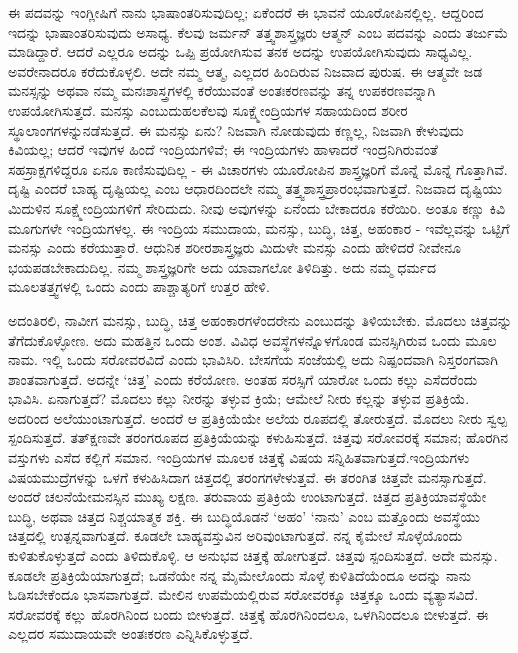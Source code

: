 ಈ ಪದವನ್ನು ಇಂಗ್ಲೀಷಿಗೆ ನಾನು ಭಾಷಾಂತರಿಸುವುದಿಲ್ಲ; ಏಕೆಂದರೆ ಈ ಭಾವನೆ ಯೂರೋಪಿನಲ್ಲಿಲ್ಲ. ಆದ್ದರಿಂದ ಇದನ್ನು ಭಾಷಾಂತರಿಸುವುದು ಅಸಾಧ್ಯ. ಕೆಲವು ಜರ್ಮನ್​ ತತ್ತ್ವಶಾಸ್ತ್ರಜ್ಞರು ಆತ್ಮನ್​ ಎಂಬ ಪದವನ್ನು  ಎಂದು ತರ್ಜುಮೆ ಮಾಡಿದ್ದಾರೆ. ಆದರೆ ಎಲ್ಲರೂ ಅದನ್ನು ಒಪ್ಪಿ ಪ್ರಯೋಗಿಸುವ ತನಕ ಅದನ್ನು ಉಪಯೋಗಿಸುವುದು ಸಾಧ್ಯವಿಲ್ಲ. ಅವರೇನಾದರೂ ಕರೆದು\-ಕೊಳ್ಳಲಿ. ಅದೇ ನಮ್ಮ ಆತ್ಮ, ಎಲ್ಲದರ ಹಿಂದಿರುವ ನಿಜವಾದ ಪುರುಷ. ಈ ಆತ್ಮವೇ ಜಡ ಮನಸ್ಸನ್ನು ಅಥವಾ ನಮ್ಮ ಮನಃಶಾಸ್ತ್ರಗಳಲ್ಲಿ ಕರೆಯುವಂತೆ ಅಂತಃಕರಣವನ್ನು ತನ್ನ ಉಪಕರಣವನ್ನಾಗಿ ಉಪಯೋಗಿಸುತ್ತದೆ. ಮನಸ್ಸು ಎಂಬುದು\break ಹಲಕೆಲವು ಸೂಕ್ಷ್ಮೇಂದ್ರಿಯಗಳ ಸಹಾಯದಿಂದ ಶರೀರ ಸ್ಥೂಲಾಂಗಗಳನ್ನು\break ನಡೆಸುತ್ತದೆ. ಈ ಮನಸ್ಸು ಏನು? ನಿಜವಾಗಿ ನೋಡುವುದು ಕಣ್ಣಲ್ಲ, ನಿಜವಾಗಿ ಕೇಳುವುದು ಕಿವಿಯಲ್ಲ; ಆದರೆ ಇವುಗಳ ಹಿಂದೆ ಇಂದ್ರಿಯಗಳಿವೆ; ಈ ಇಂದ್ರಿಯಗಳು ಹಾಳಾದರೆ ಇಂದ್ರನಿಗಿರುವಂತೆ ಸಹಸ್ರಾಕ್ಷಗಳಿದ್ದರೂ ಏನೂ ಕಾಣಿಸುವು\-ದಿಲ್ಲ - ಈ ವಿಚಾರಗಳು ಯೂರೋಪಿನ ಶಾಸ್ತ್ರಜ್ಞರಿಗೆ ಮೊನ್ನೆ ಮೊನ್ನೆ ಗೊತ್ತಾಗಿವೆ. ದೃಷ್ಟಿ ಎಂದರೆ ಬಾಹ್ಯ ದೃಷ್ಟಿಯಲ್ಲ ಎಂಬ ಆಧಾರದಿಂದಲೇ ನಮ್ಮ ತತ್ತ್ವಶಾಸ್ತ್ರಪ್ರಾರಂಭವಾಗುತ್ತದೆ. ನಿಜವಾದ ದೃಷ್ಟಿಯು ಮಿದುಳಿನ ಸೂಕ್ಷ್ಮೇಂದ್ರಿಯಗಳಿಗೆ ಸೇರಿದುದು. ನೀವು ಅವುಗಳನ್ನು ಏನೆಂದು ಬೇಕಾದರೂ ಕರೆಯಿರಿ. ಅಂತೂ ಕಣ್ಣು ಕಿವಿ ಮೂಗುಗಳೇ ಇಂದ್ರಿಯಗಳಲ್ಲ. ಈ ಇಂದ್ರಿಯ ಸಮುದಾಯ, ಮನಸ್ಸು, ಬುದ್ಧಿ, ಚಿತ್ತ, ಅಹಂಕಾರ - ಇವೆಲ್ಲವನ್ನು ಒಟ್ಟಿಗೆ ಮನಸ್ಸು  ಎಂದು ಕರೆಯುತ್ತಾರೆ. ಆಧುನಿಕ ಶರೀರಶಾಸ್ತ್ರಜ್ಞರು ಮಿದುಳೇ ಮನಸ್ಸು ಎಂದು ಹೇಳಿದರೆ ನೀವೇನೂ ಭಯಪಡಬೇಕಾದುದಿಲ್ಲ. ನಮ್ಮ ಶಾಸ್ತ್ರಜ್ಞರಿಗೇ ಅದು ಯಾವಾಗಲೋ ತಿಳಿದಿತ್ತು. ಅದು ನಮ್ಮ ಧರ್ಮದ ಮೂಲತತ್ತ್ವಗಳಲ್ಲಿ ಒಂದು ಎಂದು ಪಾಶ್ಚಾತ್ಯರಿಗೆ ಉತ್ತರ ಹೇಳಿ.

ಅದಂತಿರಲಿ, ನಾವೀಗ ಮನಸ್ಸು, ಬುದ್ಧಿ, ಚಿತ್ತ ಅಹಂಕಾರಗಳೆಂದರೇನು ಎಂಬುದನ್ನು ತಿಳಿಯಬೇಕು. ಮೊದಲು ಚಿತ್ತವನ್ನು ತೆಗೆದುಕೊಳ್ಳೋಣ. ಅದು ಮಹತ್ತಿನ ಒಂದು ಅಂಶ. ವಿವಿಧ ಅವಸ್ಥೆಗಳನ್ನೊಳಗೊಂಡ ಮನಸ್ಸಿಗಿರುವ ಒಂದು ಮೂಲ ನಾಮ. ಇಲ್ಲಿ ಒಂದು ಸರೋವರವಿದೆ ಎಂದು ಭಾವಿಸಿರಿ. ಬೇಸಗೆಯ ಸಂಜೆಯಲ್ಲಿ ಅದು ನಿಷ್ಪಂದವಾಗಿ ನಿಸ್ತರಂಗವಾಗಿ ಶಾಂತವಾಗುತ್ತದೆ. ಅದನ್ನೇ ‘ಚಿತ್ತ’ ಎಂದು ಕರೆಯೋಣ. ಅಂತಹ ಸರಸ್ಸಿಗೆ ಯಾರೋ ಒಂದು ಕಲ್ಲು ಎಸೆದರೆಂದು ಭಾವಿಸಿ. ಏನಾಗುತ್ತದೆ? ಮೊದಲು ಕಲ್ಲು ನೀರನ್ನು ತಳ್ಳುವ ಕ್ರಿಯೆ; ಆಮೇಲೆ ನೀರು ಕಲ್ಲನ್ನು ತಳ್ಳುವ ಪ್ರತಿಕ್ರಿಯೆ. ಅದರಿಂದ ಅಲೆಯುಂಟಾಗುತ್ತದೆ. ಅಂದರೆ ಆ ಪ್ರತಿಕ್ರಿಯೆಯೇ ಅಲೆಯ ರೂಪದಲ್ಲಿ ತೋರುತ್ತದೆ. ಮೊದಲು ನೀರು ಸ್ವಲ್ಪ ಸ್ಪಂದಿಸುತ್ತದೆ. ತತ್​ಕ್ಷಣವೇ ತರಂಗರೂಪದ ಪ್ರತಿಕ್ರಿಯೆಯನ್ನು ಕಳುಹಿಸುತ್ತದೆ. ಚಿತ್ತವು ಸರೋವರಕ್ಕೆ ಸಮಾನ; ಹೊರಗಿನ ವಸ್ತುಗಳು ಎಸೆದ ಕಲ್ಲಿಗೆ ಸಮಾನ. ಇಂದ್ರಿಯಗಳ ಮೂಲಕ ಚಿತ್ತಕ್ಕೆ ವಿಷಯ ಸನ್ನಿಹಿತವಾಗುತ್ತದೆ.\break ಇಂದ್ರಿಯಗಳು ವಿಷಯಮುದ್ರೆಗಳನ್ನು ಒಳಗೆ ಕಳುಹಿಸಿದಾಗ ಚಿತ್ತದಲ್ಲಿ ತರಂಗಗಳೇಳುತ್ತವೆ. ಈ ತರಂಗಿತ ಚಿತ್ತವೇ ಮನಸ್ಸಾಗುತ್ತದೆ. ಅಂದರೆ ಚಲನೆಯೇ\break ಮನಸ್ಸಿನ ಮುಖ್ಯ ಲಕ್ಷಣ. ತರುವಾಯ ಪ್ರತಿಕ್ರಿಯೆ ಉಂಟಾಗುತ್ತದೆ. ಚಿತ್ತದ ಪ್ರತಿಕ್ರಿಯಾವಸ್ಥೆಯೇ ಬುದ್ಧಿ, ಅಥವಾ ಚಿತ್ತದ ನಿಶ್ಚಯಾತ್ಮಕ ಶಕ್ತಿ. ಈ ಬುದ್ಧಿಯೊಡನೆ ‘ಅಹಂ’ ‘ನಾನು’ ಎಂಬ ಮತ್ತೊಂದು ಅವಸ್ಥೆಯು ಚಿತ್ತದಲ್ಲಿ ಉತ್ಪನ್ನವಾಗುತ್ತದೆ. ಕೂಡಲೇ ಬಾಹ್ಯವಸ್ತುವಿನ ಅರಿವುಂಟಾಗುತ್ತದೆ. ನನ್ನ ಕೈಮೇಲೆ ಸೊಳ್ಳೆಯೊಂದು ಕುಳಿತುಕೊಳ್ಳುತ್ತದೆ ಎಂದು ತಿಳಿದುಕೊಳ್ಳಿ. ಆ ಅನುಭವ ಚಿತ್ತಕ್ಕೆ ಹೋಗುತ್ತದೆ. ಚಿತ್ತವು ಸ್ಪಂದಿಸುತ್ತದೆ. ಅದೇ ಮನಸ್ಸು. ಕೂಡಲೇ ಪ್ರತಿಕ್ರಿಯೆಯಾಗುತ್ತದೆ; ಒಡನೆಯೇ ನನ್ನ ಮೈಮೇಲೊಂದು ಸೊಳ್ಳೆ ಕುಳಿತಿದೆಯೆಂದೂ ಅದನ್ನು ನಾನು ಓಡಿಸಬೇಕೆಂದೂ ಭಾಸವಾಗುತ್ತದೆ. ಮೇಲಿನ ಉಪಮೆಯಲ್ಲಿರುವ ಸರೋವರಕ್ಕೂ ಚಿತ್ತಕ್ಕೂ ಒಂದು ವ್ಯತ್ಯಾಸವಿದೆ. ಸರೋವರಕ್ಕೆ ಕಲ್ಲು ಹೊರಗಿನಿಂದ ಬಂದು ಬೀಳುತ್ತದೆ. ಚಿತ್ತಕ್ಕೆ ಹೊರಗಿನಿಂದಲೂ, ಒಳಗಿನಿಂದಲೂ ಬೀಳುತ್ತದೆ. ಈ ಎಲ್ಲದರ ಸಮುದಾಯವೇ ಅಂತಃಕರಣ ಎನ್ನಿಸಿಕೊಳ್ಳುತ್ತದೆ.

